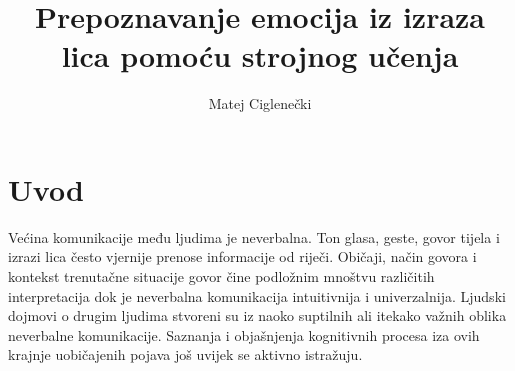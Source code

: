 \documentclass[times, utf8, zavrsni,numeric,pstricks]{fer}
\begin{document}

\title{Prepoznavanje emocija iz izraza lica pomoću strojnog učenja}

\author{Matej Ciglenečki}

\maketitle

\izvornik


\tableofcontents

\chapter{Uvod}

Većina komunikacije među ljudima je neverbalna. Ton glasa, geste, govor tijela i izrazi lica često vjernije prenose informacije od riječi. Običaji, način govora i kontekst trenutačne situacije govor čine podložnim mnoštvu različitih interpretacija dok je neverbalna komunikacija intuitivnija i univerzalnija. Ljudski dojmovi o drugim ljudima stvoreni su iz naoko suptilnih ali itekako važnih oblika neverbalne komunikacije. Saznanja i objašnjenja kognitivnih procesa iza ovih krajnje uobičajenih pojava još uvijek se aktivno istražuju. 
\end{document}
